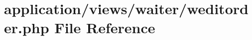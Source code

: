 \hypertarget{weditorder_8php}{}\section{application/views/waiter/weditorder.php File Reference}
\label{weditorder_8php}
